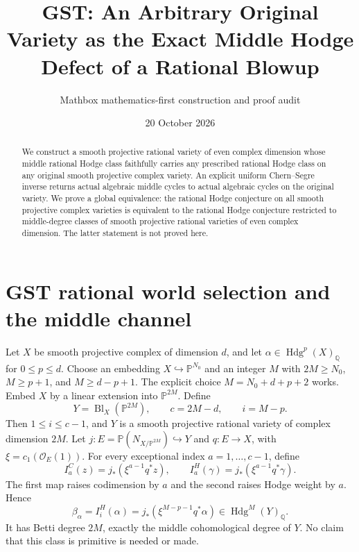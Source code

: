 \documentclass[11pt]{article}
\title{GST: An Arbitrary Original Variety as the Exact Middle Hodge Defect of a Rational Blowup}
\author{Mathbox mathematics-first construction and proof audit}
\date{20 October 2026}
\newcommand{\Q}{\mathbb Q}
\newcommand{\Hdg}{\operatorname{Hdg}}
\begin{document}
\maketitle
\begin{abstract}
We construct a smooth projective rational variety of even complex dimension
whose middle rational Hodge class faithfully carries any prescribed rational
Hodge class on any original smooth projective complex variety. An explicit
uniform Chern--Segre inverse returns actual algebraic middle cycles to actual
algebraic cycles on the original variety. We prove a global equivalence:
the rational Hodge conjecture on all smooth projective complex varieties
is equivalent to the rational Hodge conjecture restricted to middle-degree
classes of smooth projective rational varieties of even complex dimension.
The latter statement is not proved here.
\end{abstract}
\section{GST rational world selection and the middle channel}
Let $X$ be smooth projective complex of dimension $d$, and let
$\alpha\in\Hdg^p(X)_{\Q}$ for $0\le p\le d$.
Choose an embedding $X\hookrightarrow\mathbb P^{N_0}$ and an integer
$M$ with $2M\ge N_0$, $M\ge p+1$, and $M\ge d-p+1$.
The explicit choice $M=N_0+d+p+2$ works.
Embed $X$ by a linear extension into $\mathbb P^{2M}$.
Define
\[
 Y=\operatorname{Bl}_X(\mathbb P^{2M}),\qquad
 c=2M-d,\qquad i=M-p.
\]
Then $1\le i\le c-1$, and $Y$ is a smooth projective
rational variety of complex dimension $2M$.
Let $j:E=\mathbb P(N_{X/\mathbb P^{2M}})\hookrightarrow Y$ and
$q:E\to X$, with $\xi=c_1(\mathcal O_E(1))$.
For every exceptional index $a=1,\dots,c-1$, define
\[
 I_a^{C}(z)=j_*(\xi^{a-1}q^*z),\qquad
 I_a^{H}(\gamma)=j_*(\xi^{a-1}q^*\gamma).
\]
The first map raises codimension by $a$ and the second
raises Hodge weight by $a$.
Hence
\[
 \beta_\alpha=I_i^H(\alpha)
   =j_*(\xi^{M-p-1}q^*\alpha)\in\Hdg^M(Y)_{\Q}.
\]
It has Betti degree $2M$, exactly the middle cohomological degree of $Y$.
No claim that this class is primitive is needed or made.
\end{document}
